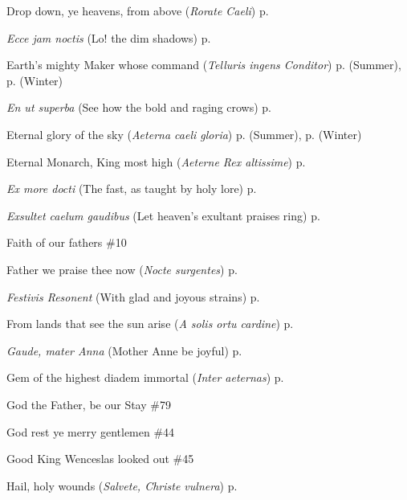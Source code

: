 \begin{hangparas}{1.25em}{1}
\par\noindent
Drop down, ye heavens, from above (\textit{Rorate Caeli}) \dotfill p. \pageref{AdventProse}
\par\noindent
\textit{Ecce jam noctis} (Lo! the dim shadows) \dotfill p. \pageref{SundayMattinsSummer}
\par\noindent
Earth's mighty Maker whose command (\textit{Telluris ingens Conditor}) \dotfill p. \pageref{TuesdayEvensongSummer} (Summer), p. \pageref{TuesdayEvensongWinter} (Winter)
\par\noindent
\textit{En ut superba} (See how the bold and raging crows) \dotfill p. \pageref{CompassionInvitatory}
\par\noindent
Eternal glory of the sky (\textit{Aeterna caeli gloria}) \dotfill p. \pageref{FridayMattinsSummer} (Summer), p. \pageref{FridayMattinsWinter} (Winter)
\par\noindent
Eternal Monarch, King most high (\textit{Aeterne Rex altissime}) \dotfill p. \pageref{AscensionInvitatory}
\par\noindent
\textit{Ex more docti} (The fast, as taught by holy lore) \dotfill p. \pageref{FirstLentInvitatory}
\par\noindent
\textit{Exsultet caelum gaudibus} (Let heaven's exultant praises ring) \dotfill p. \pageref{JohnMattins}
\par\noindent
Faith of our fathers \dotfill \#10
\par\noindent
Father we praise thee now (\textit{Nocte surgentes}) \dotfill p. \pageref{SundayInvitatorySummer}
\par\noindent
\textit{Festivis Resonent} (With glad and joyous strains) \dotfill p. \pageref{PreciousBloodEvensong}
\par\noindent
From lands that see the sun arise (\textit{A solis ortu cardine}) \dotfill p. \pageref{ChristmasMattins}
\par\noindent
\textit{Gaude, mater Anna} (Mother Anne be joyful) \dotfill p. \pageref{AnneEvensong}
\par\noindent
Gem of the highest diadem immortal (\textit{Inter aeternas}) \dotfill p. \pageref{BenedictMattins}
\par\noindent
God the Father, be our Stay \dotfill \#79
\par\noindent
God rest ye merry gentlemen \dotfill \#44
\par\noindent
Good King Wenceslas looked out \dotfill \#45
\par\noindent
Hail, holy wounds (\textit{Salvete, Christe vulnera}) \dotfill p. \pageref{PreciousBloodMattins}

\end{hangparas}
